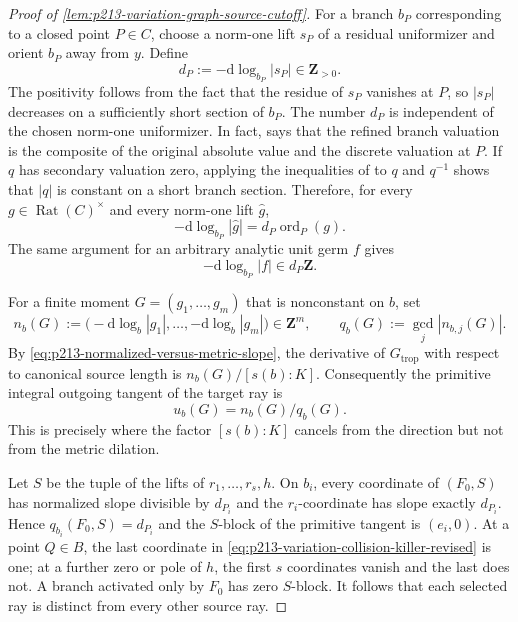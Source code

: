 \begin{proof}[Proof of
\cref{lem:p213-variation-graph-source-cutoff}]
For a branch $b_P$ corresponding to a closed point $P\in C$, choose a
norm-one lift $s_P$ of a residual uniformizer and orient $b_P$ away from
$y$.  Define
\begin{equation}
             d_P:=-\mathrm d\log_{b_P}|s_P|\in\mathbf Z_{>0}.
\label{eq:p213-variation-integral-branch-weight}
\end{equation}
The positivity follows from the fact that the residue of $s_P$ vanishes
at $P$, so $|s_P|$ decreases on a sufficiently short section of $b_P$.
The number $d_P$ is independent of the chosen norm-one uniformizer.  In
fact, \cite[\S4.2.11.1]{Ducros24CurveStructure} says that the refined
branch valuation is the composite of the original absolute value and the
discrete valuation at $P$.  If $q$ has secondary valuation zero, applying
the inequalities of \cite[\S4.2.6]{Ducros24CurveStructure} to $q$ and
$q^{-1}$ shows that $|q|$ is constant on a short branch section.  Therefore,
for every $g\in\operatorname{Rat}(C)^\times$ and every norm-one lift
$\widehat g$,
\begin{equation}
       -\mathrm d\log_{b_P}|\widehat g|
                 =d_P\operatorname{ord}_P(g).
\label{eq:p213-variation-residual-normalized-slope}
\end{equation}
The same argument for an arbitrary analytic unit germ $f$ gives
\[
                  -\mathrm d\log_{b_P}|f|\in d_P\mathbf Z.
\]

For a finite moment $G=(g_1,\ldots,g_m)$ that is nonconstant on $b$, set
\begin{equation}
 n_b(G):=\bigl(-\mathrm d\log_b|g_1|,\ldots,
                    -\mathrm d\log_b|g_m|\bigr)\in\mathbf Z^m,
 \qquad q_b(G):=\gcd_j|n_{b,j}(G)|.
\label{eq:p213-integral-slope-vector}
\end{equation}
By \eqref{eq:p213-normalized-versus-metric-slope}, the derivative of
$G_{\mathrm{trop}}$ with respect to canonical source length is
$n_b(G)/[s(b):K]$.  Consequently the primitive integral outgoing tangent
of the target ray is
\begin{equation}
                              u_b(G)=n_b(G)/q_b(G).
\label{eq:p213-primitive-integral-tangent}
\end{equation}
This is precisely where the factor $[s(b):K]$ cancels from the direction
but not from the metric dilation.

Let $S$ be the tuple of the lifts of $r_1,\ldots,r_s,h$.  On $b_i$, every
coordinate of $(F_0,S)$ has normalized slope divisible by $d_{P_i}$ and
the $r_i$-coordinate has slope exactly $d_{P_i}$.  Hence
$q_{b_i}(F_0,S)=d_{P_i}$ and the $S$-block of the primitive tangent is
$(e_i,0)$.  At a point $Q\in B$, the last coordinate in
\eqref{eq:p213-variation-collision-killer-revised} is one; at a further
zero or pole of $h$, the first $s$ coordinates vanish and the last does
not.  A branch activated only by $F_0$ has zero $S$-block.  It follows
that each selected ray is distinct from every other source ray.


\end{proof}
